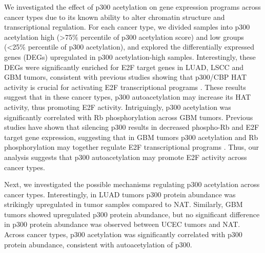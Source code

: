 We investigated the effect of p300 acetylation on gene expression programs across cancer types due to its known ability to alter chromatin structure and transcriptional regulation. For each cancer type, we divided samples into p300 acetylation high (>75\% percentile of p300 acetylation score) and low groups (<25\% percentile of p300 acetylation), and explored the differentially expressed genes (DEGs) upregulated in p300 acetylation-high samples. Interestingly, these DEGs were significantly enriched for E2F target genes in LUAD, LSCC and GBM tumors, consistent with previous studies showing that p300/CBP HAT activity is crucial for activating E2F transcriptional programs \cite{ait-si-alis_harel-bellana:CBPP3002000}. These results suggest that in these cancer types, p300 autoacetylation may increase its HAT activity, thus promoting E2F activity. Intriguingly, p300 acetylation was significantly correlated with Rb phosphorylation across GBM tumors. Previous studies have shown that silencing p300 results in decreased phospho-Rb and E2F target gene expression, suggesting that in GBM tumors p300 acetylation and Rb phosphorylation may together regulate E2F transcriptional programs \cite{fauquierl_vandell:CBPP3002018}. Thus, our analysis suggests that p300 autoacetylation may promote E2F activity across cancer types.

Next, we investigated the possible mechanisms regulating p300 acetylation across cancer types. Interestingly, in LUAD tumors p300 protein abundance was strikingly upregulated in tumor samples compared to NAT. Similarly, GBM tumors showed upregulated p300 protein abundance, but no significant difference in p300 protein abundance was observed between UCEC tumors and NAT. Across cancer types, p300 acetylation was significantly correlated with p300 protein abundance, consistent with autoacetylation of p300.

